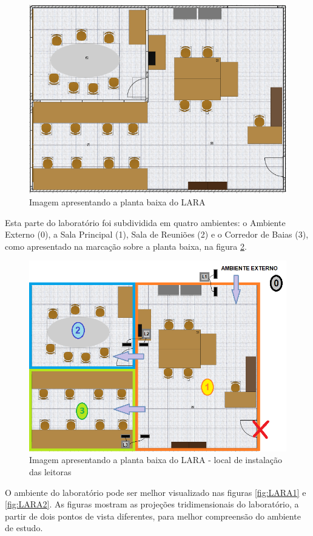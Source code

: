    \begin{figure}[H]
    \centering
    \includegraphics[width=0.7\linewidth]{figs/Metodologia/LARA_planta.PNG}
    \caption{Imagem apresentando a planta baixa do LARA}
    \label{fig:LARA_plata}
\end{figure}
 
 Esta parte do laboratório foi subdividida em quatro ambientes: o Ambiente Externo (0), a Sala Principal (1), Sala de Reuniões (2) e o Corredor de Baias (3), como apresentado na marcação sobre a planta baixa, na figura \ref{fig:LARA_planta}.

  \begin{figure}[H]
    \centering
    \includegraphics[width=0.7\linewidth]{figs/Metodologia/LARA_planta_ambientes.png}
    \caption{Imagem apresentando a planta baixa do LARA - local de instalação das leitoras}
    \label{fig:LARA_planta}
\end{figure}

O ambiente do laboratório pode ser melhor visualizado nas figuras \ref{fig:LARA1} e \ref{fig:LARA2}. As figuras mostram as projeções tridimensionais do laboratório, a partir de dois pontos de vista diferentes, para melhor compreensão do ambiente de estudo.

